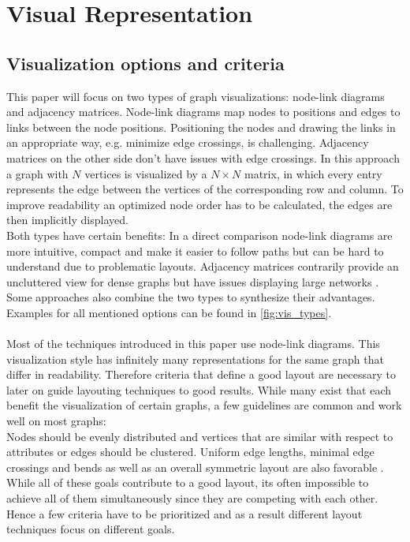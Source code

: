 \section{Visual Representation}
\subsection{Visualization options and criteria}
This paper will focus on two types of graph visualizations: node-link diagrams and adjacency matrices.
Node-link diagrams map nodes to positions and edges to links between the node positions. Positioning the nodes and drawing the links in an appropriate way, e.g. minimize edge crossings, is challenging. Adjacency matrices on the other side don't have issues with edge crossings. In this approach a graph with $N$ vertices is visualized by a $N \times N $ matrix, in which every entry represents the edge between the vertices of the corresponding row and column. To improve readability an optimized node order has to be calculated, the edges are then implicitly displayed.\\
Both types have certain benefits: In a direct comparison node-link diagrams are more intuitive, compact and make it easier to follow paths but can be hard to understand due to problematic layouts. Adjacency matrices contrarily provide an uncluttered view for dense graphs but have issues displaying large networks \cite{Ghoniem2004}. Some approaches also combine the two types to synthesize their advantages. Examples for all mentioned options can be found in \autoref{fig:vis_types}.
\\\\
Most of the techniques introduced in this paper use node-link diagrams. This visualization style has infinitely many representations for the same graph that differ in readability. Therefore criteria that define a good layout are necessary to later on guide layouting techniques to good results. While many exist that each benefit the visualization of certain graphs, a few guidelines are common and work well on most graphs: \\
Nodes should be evenly distributed and vertices that are similar with respect to attributes or edges should be clustered. Uniform edge lengths, minimal edge crossings and bends as well as an overall symmetric layout are also favorable \cite{Bennett2007}. \\
While all of these goals contribute to a good layout, its often impossible to achieve all of them simultaneously since they are competing with each other\cite{Gibson2013}. Hence a few criteria have to be prioritized and as a result different layout techniques focus on different goals.
